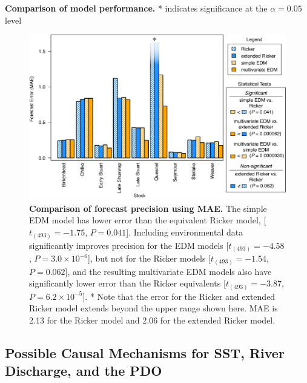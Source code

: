 \begin{table}
\caption[Comparison of model performance.]{\textbf{Comparison of model performance.}\newline
* indicates significance at the $\alpha = 0.05$ level}
\label{tab_salmon_stats}
\begin{center}

\end{center}
\end{table}

\begin{figure}[!ht]
\begin{center}\includegraphics[width=\maxwidth{\textwidth}]{fig_salmon_s3.pdf}\end{center}
\caption[Comparison of forecast precision using MAE.]{\textbf{Comparison of forecast precision using MAE.}\newline
The simple EDM model has lower error than the equivalent Ricker model, [$t_{(493)} = -1.75$, $P = 0.041$]. Including environmental data significantly improves precision for the EDM models [$t_{(493)} = -4.58$, $P = 3.0\times10^{-6}$], but not for the Ricker models [$t_{(493)} = -1.54$, $P = 0.062$], and the resulting multivariate EDM models also have significantly lower error than the Ricker equivalents [$t_{(493)} = -3.87$, $P = 6.2\times10^{-5}$].\newline
\hspace{\linewidth}
* Note that the error for the Ricker and extended Ricker model extends beyond the upper range shown here. MAE is 2.13 for the Ricker model and 2.06 for the extended Ricker model.}
\label{fig_salmon_model_comparison_mae}
\end{figure}

\subsection{Possible Causal Mechanisms for SST, River Discharge, and the PDO}

